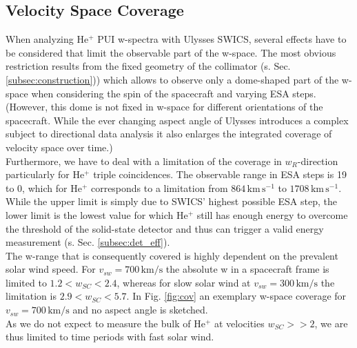 \subsection{Velocity Space Coverage}
\label{subsec:cov}
When analyzing $\mathrm{He^{+}}$ PUI w-spectra with Ulysses SWICS, several effects have to be considered that limit the observable part of the w-space. The most obvious restriction results from the fixed geometry of the collimator (s. Sec. \ref{subsec:construction})) which allows to observe only a dome-shaped part of the w-space when considering the spin of the spacecraft and varying ESA steps. (However, this dome is not fixed in w-space for different orientations of the spacecraft.
While the ever changing aspect angle of Ulysses introduces a complex subject to directional data analysis it also enlarges the integrated coverage of velocity space over time.)\\
Furthermore, we have to deal with a limitation of the coverage in $w_R$-direction particularly for $\mathrm{He^{+}}$ triple coincidences. The observable range in ESA steps is 19 to 0, which for $\mathrm{He^{+}}$ corresponds to a limitation from $864\,\mathrm{km\,s^{-1}}$ to $1708\,\mathrm{km\,s^{-1}}$. While the upper limit is simply due to SWICS' highest possible ESA step, the lower limit is the lowest value for which $\mathrm{He^{+}}$ still has enough energy to overcome the threshold of the solid-state detector and thus can trigger a valid energy measurement (s. Sec. \ref{subsec:det_eff}).\\
The w-range that is consequently covered is highly dependent on the prevalent solar wind speed. For $v_{sw} = 700 \,\mathrm{km/s}$ the absolute w in a spacecraft frame is limited to $1.2 < w_{SC} < 2.4$, whereas for slow solar wind at $v_{sw} = 300 \,\mathrm{km/s}$ the limitation is $2.9 < w_{SC} < 5.7$. 
In Fig. \ref{fig:cov} an exemplary w-space coverage for $v_{sw} = 700 \,\mathrm{km/s}$ and no aspect angle is sketched.\\
As we do not expect to measure the bulk of $\mathrm{He^{+}}$ at velocities $w_{SC}>>2$, we are thus limited to time periods with fast solar wind.
